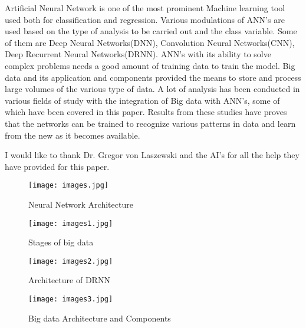 \documentclass[sigconf]{acmart}
\begin{document}
Artificial Neural Network is one of the most prominent Machine learning tool used both for classification and regression. Various modulations of ANN's are used based on the type of analysis to be carried out and the class variable. Some of them are Deep Neural Networks(DNN), Convolution Neural Networks(CNN), Deep Recurrent Neural Networks(DRNN). ANN's with its ability to solve complex problems needs a good amount of training data to train the model. Big data and its application and components provided the means to store and process large volumes of the various type of data. A lot of analysis has been conducted in various fields of study with the integration of Big data with ANN's, some of which have been covered in this paper. Results from these studies have proves that the networks can be trained to recognize various patterns in data and learn from the new as it becomes available.







\begin{acks}

I would like to thank Dr. Gregor von Laszewski and the AI's for all the help they have provided for this paper.
\end{acks}




 

\begin{figure}[htp]
    \texttt{[image: images.jpg]}
    \caption{Neural Network Architecture \cite{google}}
    \label{fig:figure1}
\end{figure}

\begin{figure}[htp]
    \texttt{[image: images1.jpg]}
    \caption{Stages of big data}
    \label{fig:figure2}
\end{figure}

\begin{figure}[htp]
    \texttt{[image: images2.jpg]}
    \caption{Architecture of DRNN}
    \label{fig:figure3}
\end{figure}

\begin{figure}[htp]
    \texttt{[image: images3.jpg]}
    \caption{Big data Architecture and Components \cite{www-google}}
    \label{fig:figure4}
\end{figure}
\end{document}
